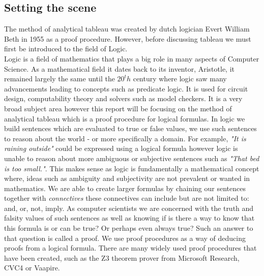 \documentclass{article}%
\begin{document}
\subsection{Setting the scene}
The method of analytical tableau was created by dutch logician Evert William Beth in 1955 as a proof procedure. However, before discussing tableau we must first be introduced to the field of Logic. \\Logic is a field of mathematics that plays a big role in many aspects of Computer Science. As a mathematical field it dates back to its inventor, Aristotle, it remained largely the same until the $20^th$ century where logic saw many advancements leading to concepts such as predicate logic. It is used for circuit design, computability theory and solvers such as model checkers. It is a very broad subject area however this report will be focusing on the method of analytical tableau which is a proof procedure for logical formulas. In logic we build sentences which are evaluated to true or false values, we use such sentences to reason about the world - or more specifically a domain. For example, \textit{"It is raining outside"} could be expressed using a logical formula however logic is unable to reason about more ambiguous or subjective sentences such as \textit{"That bed is too small."}. This makes sense as logic is fundamentally a mathematical concept where, ideas such as ambiguity and subjectivity are not prevalent or wanted in mathematics.
We are able to create larger formulas by chaining our sentences together with \textit{connectives} these connectives can include but are not limited to: and, or, not, imply.
As computer scientists we are concerned with the truth and falsity values of such sentences as well as knowing if is there a way to know that this formula is or can be true? Or perhaps even always true? Such an answer to that question is called a proof. We use proof procedures as a way of deducing proofs from a logical formula. There are many widely used proof procedures that have been created, such as the Z3 theorem prover from Microsoft Research, CVC4 or Vaapire.   
\end{document}
